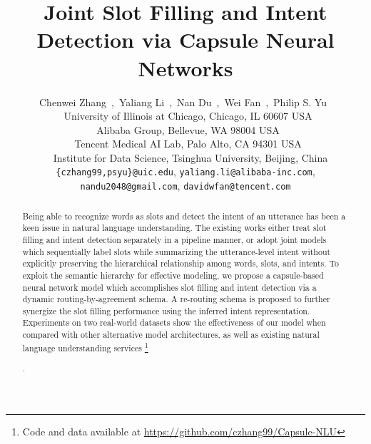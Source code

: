 \documentclass[11pt,a4paper,hyphens]{article}
\title{Joint Slot Filling and Intent Detection via Capsule Neural Networks}
\author{Chenwei Zhang\footnotemark[2]~,~Yaliang Li\footnotemark[4]~,~Nan Du\footnotemark[3]~,~Wei Fan\footnotemark[3]~,~Philip S. Yu\footnotemark[2]~\footnotemark[5]\\
  \footnotemark[2]~University of Illinois at Chicago, Chicago, IL 60607 USA\\
  \footnotemark[4]~Alibaba Group, Bellevue, WA 98004 USA\\
  \footnotemark[3]~Tencent Medical AI Lab, Palo Alto, CA 94301 USA\\
  \footnotemark[5]~~Institute for Data Science, Tsinghua University, Beijing, China\\
  {\tt \{czhang99,psyu\}@uic.edu}, {\tt yaliang.li@alibaba-inc.com},\\
  {\tt nandu2048@gmail.com}, {\tt davidwfan@tencent.com}\\
  }
\date{}
\newcommand\blfootnote[1]{%
  \begingroup
  \renewcommand\thefootnote{}\footnote{#1}%
  \addtocounter{footnote}{-1}%
  \endgroup
}
\begin{document}
\maketitle
\begin{abstract}
Being able to recognize words as slots and detect the intent of an utterance has been a keen issue in natural language understanding. The existing works either treat slot filling and intent detection separately in a pipeline manner, or adopt joint models which sequentially label slots while summarizing the utterance-level intent without explicitly preserving the hierarchical relationship among words, slots, and intents. To exploit the semantic hierarchy for effective modeling, we propose a capsule-based neural network model which accomplishes slot filling and intent detection via a dynamic routing-by-agreement schema. A re-routing schema is proposed to further synergize the slot filling performance using the inferred intent representation. Experiments on two real-world datasets show the effectiveness of our model when compared with other alternative model architectures, as well as existing natural language understanding services\blfootnote{Code and data available at \url{https://github.com/czhang99/Capsule-NLU}}.
\end{abstract}










\balance
\end{document}
